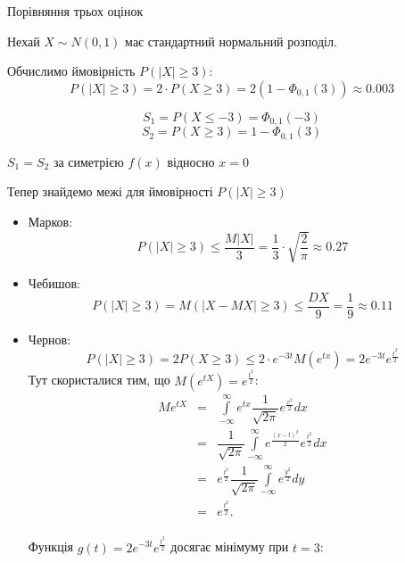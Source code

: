 \begin{example}
    Порівняння трьох оцінок
    
    Нехай $X \sim N(0, 1)$ має стандартний нормальний розподіл.

    Обчислимо ймовірність $P(|X| \geqslant 3)$:
    $$P(|X| \geqslant 3) = 2 \cdot P(X \geqslant 3) = 2 (1 - \Phi_{0, 1}(3)) \approx 0.003$$

    \beautifulImage

    $$S_1 = P(X \leqslant -3) = \Phi_{0, 1}(-3)$$
    $$S_2 = P(X \geqslant 3) = 1 - \Phi_{0, 1}(3)$$

    $S_1 = S_2$ за симетрією $f(x)$ відносно $x = 0$

    Тепер знайдемо межі для ймовірності $P(|X| \geqslant 3)$

    \begin{itemize}
        \item Марков:
            $$P(|X| \geqslant 3) \leqslant \dfrac{M|X|}{3} = \dfrac{1}{3} \cdot \sqrt{\dfrac{2}{\pi}} \approx 0.27$$
        \item Чебишов:
            $$P(|X| \geqslant 3) = M(|X - MX| \geqslant 3) \leqslant \dfrac{DX}{9} = \dfrac{1}{9} \approx 0.11$$
        \item Чернов:
            \begin{equation}
                \label{assessment_limits_equation_chernow}
                P(|X| \geqslant 3) = 2 P(X \geqslant 3)
                \leqslant 2 \cdot e^{-3t} M(e^{tx}) = 2 e^{-3t} e^{\frac{t^2}{2}}
            \end{equation}
            Тут скористалися тим, що $M(e^{tX}) = e^{\frac{t^2}{2}}$:
            $$\begin{array}{rcl}
                Me^{tX} & = & \int\limits_{-\infty}^{\infty}
                    e^{tx} \dfrac{1}{\sqrt{2\pi}} e^{\frac{x^2}{2}} dx \\
                & = & \dfrac{1}{\sqrt{2\pi}} \int\limits_{-\infty}^{\infty} e^{\frac{(x-t)^2}{2}} e^{\frac{t^2}{2}} dx \\
                & = & e^{\frac{t^2}{2}} \dfrac{1}{\sqrt{2\pi}} \int\limits_{-\infty}^{\infty} e^{\frac{y^2}{2}} dy \\
                & = & e^{\frac{t^2}{2}}. \\
            \end{array}$$
            
            Функція $g(t) = 2 e^{-3t} e^{\frac{t^2}{2}}$ досягає
            мінімуму при $t = 3$:


\end{itemize}
\end{example}
